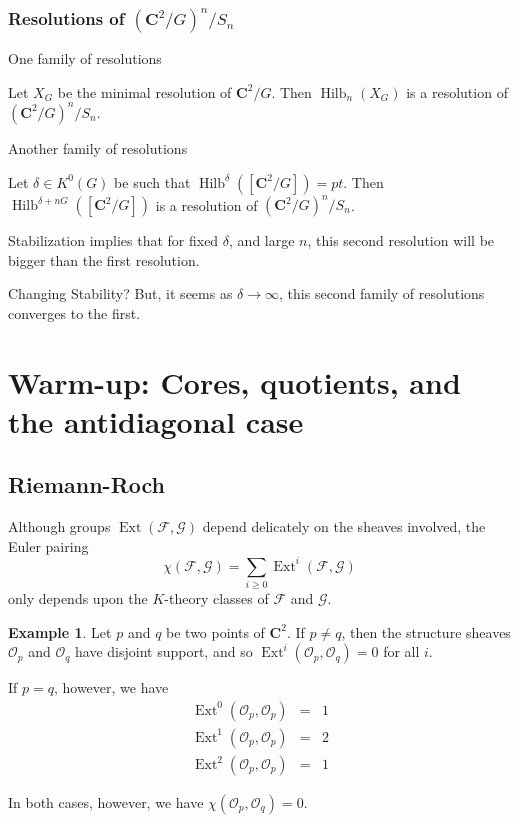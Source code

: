 \documentclass{amsart}[12pt]
\theoremstyle{definition}
\newtheorem{example}[dummy]{Example}
\newcommand{\C}{\mathbf{C}}
\DeclareMathOperator{\Hilb}{Hilb}
\DeclareMathOperator{\Ext}{Ext}
\begin{document}
\subsubsection{Resolutions of $(\C^2/G)^n/S_n$}
One family of resolutions

Let $X_G$ be the minimal resolution of $\C^2/G$.  Then $\Hilb_n(X_G)$ is a resolution of $(\C^2/G)^n/S_n$.


Another family of resolutions

Let $\delta\in K^0(G)$ be such that $\Hilb^\delta([\C^2/G])=pt$.  Then $\Hilb^{\delta+nG}([\C^2/G])$ is a resolution of $(\C^2/G)^n/S_n$.  



Stabilization implies that for fixed $\delta$, and large $n$, this second resolution will be bigger than the first resolution.

Changing Stability?
But, it seems as $\delta\to\infty$, this second family of resolutions converges to the first.


\section{Warm-up: Cores, quotients, and the antidiagonal case}




\subsection{Riemann-Roch}

Although groups $\Ext(\mathcal{F},\mathcal{G})$ depend delicately on the sheaves involved, the Euler pairing
$$\chi(\mathcal{F},\mathcal{G})=\sum_{i\geq 0} \Ext^i(\mathcal{F},\mathcal{G})$$
only depends upon the $K$-theory classes of $\mathcal{F}$ and $\mathcal{G}$.

\begin{example}
Let $p$ and $q$ be two points of $\C^2$.  If $p\neq q$, then the structure sheaves $\mathcal{O}_p$ and $\mathcal{O}_q$ have disjoint support, and so $\Ext^i(\mathcal{O}_p,\mathcal{O}_q)=0$ for all $i$.

If $p=q$, however, we have 
\begin{eqnarray*}
\Ext^0(\mathcal{O}_p,\mathcal{O}_p)&=&1\\
\Ext^1(\mathcal{O}_p,\mathcal{O}_p)&=&2\\
\Ext^2(\mathcal{O}_p,\mathcal{O}_p)&=&1 
\end{eqnarray*}

In both cases, however, we have $\chi(\mathcal{O}_p,\mathcal{O}_q)=0$.
\end{example}
\end{document}
